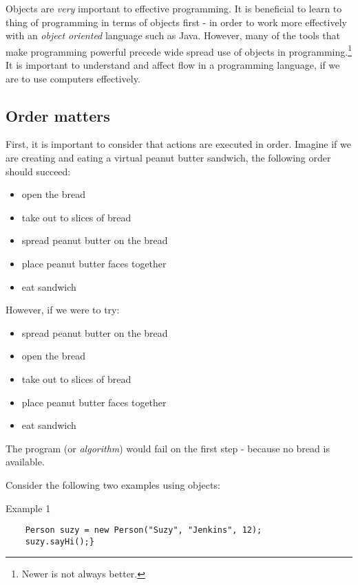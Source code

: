 \documentclass{article}
\begin{document}
\begin{flushleft}
Objects are \emph{very} important to effective programming. It is beneficial to learn to thing of programming in terms of objects first - in order to work more effectively with an \emph{object oriented} language such as Java. However, many of the tools that make programming powerful precede wide spread use of objects in programming.\footnote{Newer is not always better.} It is important to understand and affect flow in a programming language, if we are to use computers effectively.\par

\subsection{Order matters}
First, it is important to consider that actions are executed in order. Imagine if we are creating and eating a virtual peanut butter sandwich, the following order should succeed:
\begin{itemize}
\item open the bread
\item take out to slices of bread
\item spread peanut butter on the bread
\item place peanut butter faces together
\item eat sandwich
\end{itemize}
However, if we were to try:
\begin{itemize}
\item spread peanut butter on the bread
\item open the bread
\item take out to slices of bread
\item place peanut butter faces together
\item eat sandwich
\end{itemize}
The program (or \emph{algorithm}) would fail on the first step - because no bread is available.\par
Consider the following two examples using objects:
\begin{tcolorbox}[enhanced,breakable, before upper={\let\clearpage\relax}, width=5in,center upper,fontupper=\bfseries,drop fuzzy shadow southeast,boxrule=0.4pt,sharp corners,colframe=aliceblue!80!black,colback=gray!10]

  {\Large Example 1}
  \begin{verbatim}
    Person suzy = new Person("Suzy", "Jenkins", 12);
    suzy.sayHi();}
  \end{verbatim}
\end{tcolorbox}




\end{flushleft}
\end{document}
